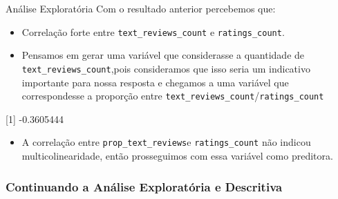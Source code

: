 \documentclass[
  9 pt,
  ignorenonframetext,
]{beamer}
\newenvironment{Shaded}{\begin{snugshade}}{\end{snugshade}}
\newcommand{\AttributeTok}[1]{\textcolor[rgb]{0.77,0.63,0.00}{#1}}
\newcommand{\FunctionTok}[1]{\textcolor[rgb]{0.00,0.00,0.00}{#1}}
\newcommand{\NormalTok}[1]{#1}
\newcommand{\OtherTok}[1]{\textcolor[rgb]{0.56,0.35,0.01}{#1}}
\newcommand{\SpecialCharTok}[1]{\textcolor[rgb]{0.00,0.00,0.00}{#1}}
\newcommand{\StringTok}[1]{\textcolor[rgb]{0.31,0.60,0.02}{#1}}
\providecommand{\tightlist}{%
  \setlength{\itemsep}{0pt}\setlength{\parskip}{0pt}}
\begin{document}
\begin{frame}[fragile]{Análise Exploratória}
Com o resultado anterior percebemos que:

\begin{itemize}
\tightlist
\item
  Correlação forte entre \texttt{text\_reviews\_count} e
  \texttt{ratings\_count}.
\item
  Pensamos em gerar uma variável que considerasse a quantidade de
  \texttt{text\_reviews\_count},pois consideramos que isso seria um
  indicativo importante para nossa resposta e chegamos a uma variável
  que correspondesse a proporção entre
  \texttt{text\_reviews\_count}/\texttt{ratings\_count}
\end{itemize}

\begin{Shaded}
\end{Shaded}

{[}1{]} -0.3605444

\begin{itemize}
\tightlist
\item
  A correlação entre \texttt{prop\_text\_reviews}e
  \texttt{ratings\_count} não indicou multicolinearidade, então
  prosseguimos com essa variável como preditora.
\end{itemize}
\end{frame}

\hypertarget{continuando-a-anuxe1lise-exploratuxf3ria-e-descritiva}{%
\subsubsection{Continuando a Análise Exploratória e
Descritiva}\label{continuando-a-anuxe1lise-exploratuxf3ria-e-descritiva}}
\end{document}
